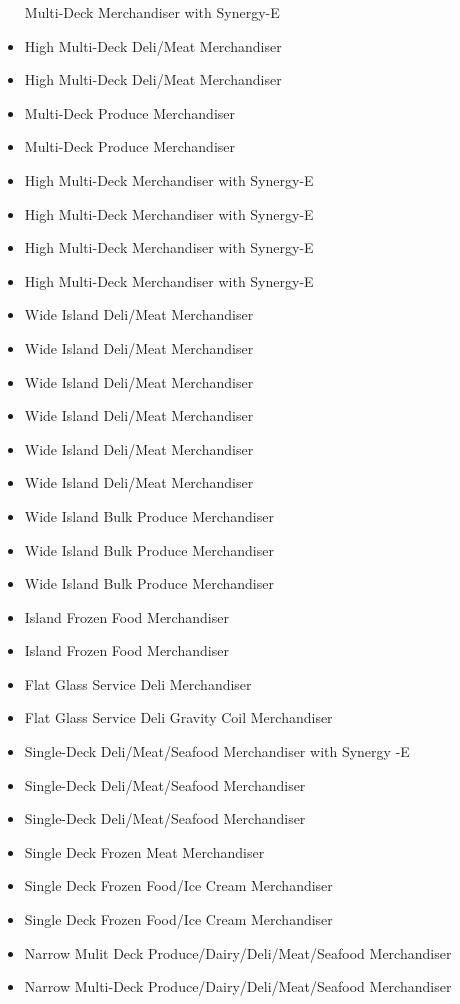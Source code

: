 \begin{itemize}
  Multi-Deck Merchandiser with Synergy-E
\item
  High Multi-Deck Deli/Meat Merchandiser
\item
  High Multi-Deck Deli/Meat Merchandiser
\item
  Multi-Deck Produce Merchandiser
\item
  Multi-Deck Produce Merchandiser
\item
  High Multi-Deck Merchandiser with Synergy-E
\item
  High Multi-Deck Merchandiser with Synergy-E
\item
  High Multi-Deck Merchandiser with Synergy-E
\item
  High Multi-Deck Merchandiser with Synergy-E
\item
  Wide Island Deli/Meat Merchandiser
\item
  Wide Island Deli/Meat Merchandiser
\item
  Wide Island Deli/Meat Merchandiser
\item
  Wide Island Deli/Meat Merchandiser
\item
  Wide Island Deli/Meat Merchandiser
\item
  Wide Island Deli/Meat Merchandiser
\item
  Wide Island Bulk Produce Merchandiser
\item
  Wide Island Bulk Produce Merchandiser
\item
  Wide Island Bulk Produce Merchandiser
\item
  Island Frozen Food Merchandiser
\item
  Island Frozen Food Merchandiser
\item
  Flat Glass Service Deli Merchandiser
\item
  Flat Glass Service Deli Gravity Coil Merchandiser
\item
  Single-Deck Deli/Meat/Seafood Merchandiser with Synergy -E
\item
  Single-Deck Deli/Meat/Seafood Merchandiser
\item
  Single-Deck Deli/Meat/Seafood Merchandiser
\item
  Single Deck Frozen Meat Merchandiser
\item
  Single Deck Frozen Food/Ice Cream Merchandiser
\item
  Single Deck Frozen Food/Ice Cream Merchandiser
\item
  Narrow Mulit Deck Produce/Dairy/Deli/Meat/Seafood Merchandiser
\item
  Narrow Multi-Deck Produce/Dairy/Deli/Meat/Seafood Merchandiser

\end{itemize}
